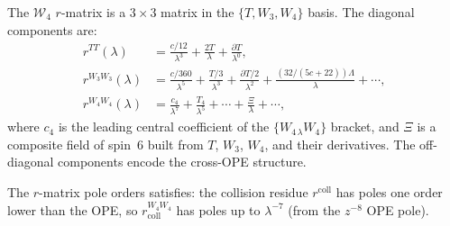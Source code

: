 \begin{computation}
\label{comp:w4-r-matrix}
%
The $\mathcal{W}_4$ $r$-matrix is a $3 \times 3$ matrix in the
$\{T, W_3, W_4\}$ basis. The diagonal components are:
\begin{align}
r^{TT}(\lambda) &= \frac{c/12}{\lambda^3}
 + \frac{2T}{\lambda} + \frac{\partial T}{\lambda^0},
 \\
r^{W_3 W_3}(\lambda) &= \frac{c/360}{\lambda^5}
 + \frac{T/3}{\lambda^3}
 + \frac{\partial T/2}{\lambda^2}
 + \frac{(32/(5c+22))\Lambda}{\lambda}
 + \cdots, \\
r^{W_4 W_4}(\lambda) &= \frac{c_4}{\lambda^7}
 + \frac{T_4}{\lambda^5}
 + \cdots
 + \frac{\Xi}{\lambda} + \cdots,
\end{align}
where $c_4$ is the leading central coefficient of the
$\{W_{4\,\lambda} W_4\}$ bracket, and $\Xi$ is a composite
field of spin~$6$ built from $T$, $W_3$, $W_4$, and their
derivatives. The off-diagonal components encode the
cross-OPE structure.

The $r$-matrix pole orders satisfies: the collision residue
$r^{\mathrm{coll}}$ has poles one order lower than the OPE,
so $r^{W_4 W_4}_{\mathrm{coll}}$ has poles up to
$\lambda^{-7}$ (from the $z^{-8}$ OPE pole).
\end{computation}

